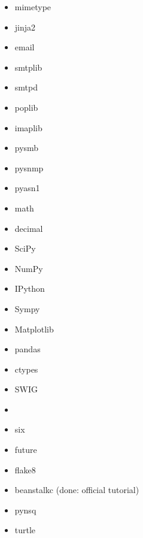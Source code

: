 \documentclass{article}
\begin{document}
\begin{enumerate}
\begin{itemize}
            \item mimetype

            \item jinja2

            \item email
            \item smtplib
            \item smtpd
            \item poplib
            \item imaplib

            \item pysmb

            \item pysnmp

            \item pyasn1

            \item math
            \item decimal
            \item SciPy
            \item NumPy
            \item IPython
            \item Sympy
            \item Matplotlib
            \item pandas

            \item ctypes
            \item SWIG

            \item

            \item six
            \item future
            \item flake8

            \item beanstalkc (done: official tutorial)
            \item pynsq

            \item turtle


\end{itemize}
\end{enumerate}
\end{document}
